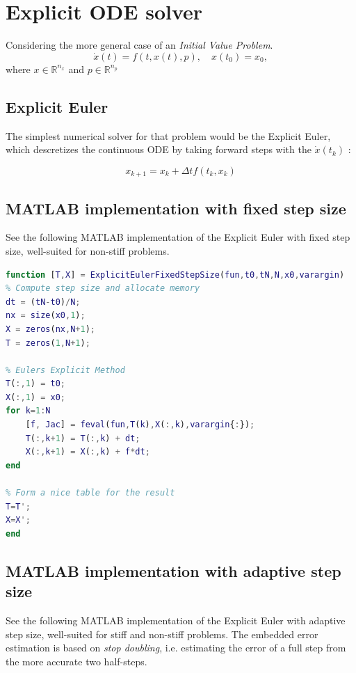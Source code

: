 \section{Explicit ODE solver}
Considering the more general case of an \textit{Initial Value Problem}.
$$
\dot{x}(t)=f(t, x(t), p), \quad x\left(t_{0}\right)=x_{0},
$$
where $x \in \mathbb{R}^{n_{x}}$ and $p \in \mathbb{R}^{n_{p}}$

\subsection{Explicit Euler}
The simplest numerical solver for that problem would be the Explicit Euler, which descretizes the continuous ODE by taking forward steps with the $\dot{x}(t_k)$ \cite{JrgensenScientificEquations}:

\begin{equation}
    x_{k+1}=x_{k}+\Delta t f\left(t_{k}, x_{k}\right)
\end{equation}

\subsection{MATLAB implementation with fixed step size}
See the following MATLAB implementation of the Explicit Euler with fixed step size, well-suited for non-stiff problems.

\begin{adjustwidth*}{0cm}{-0.4cm}
\begin{lstlisting}[language=Matlab,caption=Explicit Euler (fixed step size), label=ExplicitEulerFixie]
function [T,X] = ExplicitEulerFixedStepSize(fun,t0,tN,N,x0,varargin)
% Compute step size and allocate memory
dt = (tN-t0)/N;
nx = size(x0,1);
X = zeros(nx,N+1);
T = zeros(1,N+1);

% Eulers Explicit Method
T(:,1) = t0;
X(:,1) = x0;
for k=1:N
    [f, Jac] = feval(fun,T(k),X(:,k),varargin{:});
    T(:,k+1) = T(:,k) + dt;
    X(:,k+1) = X(:,k) + f*dt;
end

% Form a nice table for the result
T=T';
X=X';
end
\end{lstlisting}
\end{adjustwidth*}

\subsection{MATLAB implementation with adaptive step size}

See the following MATLAB implementation of the Explicit Euler with adaptive step size, well-suited for stiff and non-stiff problems. The embedded error estimation is based on \textit{stop doubling}, i.e. estimating the error of a full step from the more accurate two half-steps.

